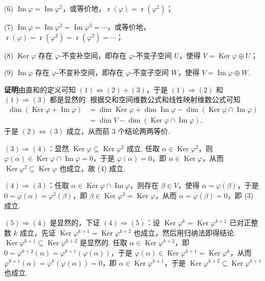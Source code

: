 \documentclass[UTF8, 12pt, fontset=fandol, oneside]{ctexart}
\begin{document}
(6) $\operatorname{Im}\varphi=\operatorname{Im}\varphi^2$，或等价地，$\operatorname{r}(\varphi)=\operatorname{r}(\varphi^2)$；

(7) $\operatorname{Im}\varphi=\operatorname{Im}\varphi^2=\operatorname{Im}\varphi^3=\cdots$，或等价地，$\operatorname{r}(\varphi)=\operatorname{r}(\varphi^2)=\operatorname{r}(\varphi^3)=\cdots$；

(8) $\operatorname{Ker}\varphi$ 存在 $\varphi$-不变补空间，即存在 $\varphi$-不变子空间 $U$，使得 $V=\operatorname{Ker}\varphi\oplus U$；

(9) $\operatorname{Im}\varphi$ 存在 $\varphi$-不变补空间，即存在 $\varphi$-不变子空间 $W$，使得 $V=\operatorname{Im}\varphi\oplus W$.

\noindent\textbf{证明}\quad 由直和的定义可知 $(1)\Leftrightarrow(2)+(3)$，于是 $(1)\Rightarrow(2)$ 和 $(1)\Rightarrow(3)$ 都是显然的. 根据交和空间维数公式和线性映射维数公式可知
\[
\begin{aligned}
\dim(\operatorname{Ker}\varphi+\operatorname{Im}\varphi)
&=\dim\operatorname{Ker}\varphi+\dim\operatorname{Im}\varphi-\dim(\operatorname{Ker}\varphi\cap\operatorname{Im}\varphi)\\
&=\dim V-\dim(\operatorname{Ker}\varphi\cap\operatorname{Im}\varphi),
\end{aligned}
\]
于是 $(2)\Leftrightarrow(3)$ 成立，从而前 3 个结论两两等价.

$(3)\Rightarrow(4)$：显然 $\operatorname{Ker}\varphi\subseteq\operatorname{Ker}\varphi^2$ 成立. 任取 $\alpha\in\operatorname{Ker}\varphi^2$，则 $\varphi(\alpha)\in\operatorname{Ker}\varphi\cap\operatorname{Im}\varphi=0$，于是 $\varphi(\alpha)=0$，即 $\alpha\in\operatorname{Ker}\varphi$，从而 $\operatorname{Ker}\varphi^2\subseteq\operatorname{Ker}\varphi$ 也成立，故 (4) 成立.

$(4)\Rightarrow(3)$：任取 $\alpha\in\operatorname{Ker}\varphi\cap\operatorname{Im}\varphi$，则存在 $\beta\in V$，使得 $\alpha=\varphi(\beta)$，于是 $0=\varphi(\alpha)=\varphi^2(\beta)$，即 $\beta\in\operatorname{Ker}\varphi^2=\operatorname{Ker}\varphi$，从而 $\alpha=\varphi(\beta)=0$，即 (3) 成立.

$(5)\Rightarrow(4)$ 是显然的，下证 $(4)\Rightarrow(5)$：设 $\operatorname{Ker}\varphi^k=\operatorname{Ker}\varphi^{k+1}$ 已对正整数 $k$ 成立，先证 $\operatorname{Ker}\varphi^{k+1}=\operatorname{Ker}\varphi^{k+2}$ 也成立，然后用归纳法即得结论. $\operatorname{Ker}\varphi^{k+1}\subseteq\operatorname{Ker}\varphi^{k+2}$ 是显然的. 任取 $\alpha\in\operatorname{Ker}\varphi^{k+2}$，即 $0=\varphi^{k+2}(\alpha)=\varphi^{k+1}(\varphi(\alpha))$，于是 $\varphi(\alpha)\in\operatorname{Ker}\varphi^{k+1}=\operatorname{Ker}\varphi^k$，从而 $\varphi^{k+1}(\alpha)=\varphi^k(\varphi(\alpha))=0$，即 $\alpha\in\operatorname{Ker}\varphi^{k+1}$，于是 $\operatorname{Ker}\varphi^{k+2}\subseteq\operatorname{Ker}\varphi^{k+1}$ 也成立.
\end{document}
